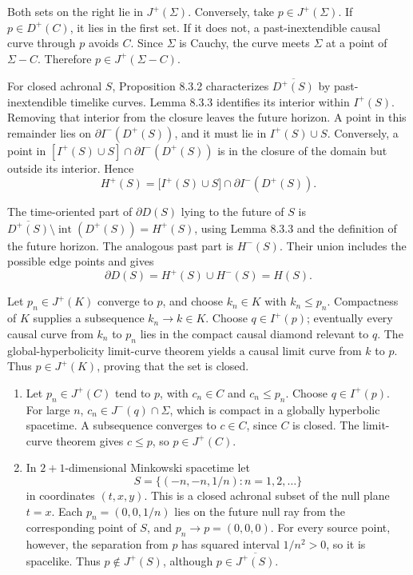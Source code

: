 \begin{enumerate}[leftmargin=2.8em,itemsep=1.2em]
Both sets on the right lie in \(J^+(\Sigma)\).  Conversely, take
\(p\in J^+(\Sigma)\).  If \(p\in D^+(C)\), it lies in the first set.  If it
does not, a past-inextendible causal curve through \(p\) avoids \(C\).  Since
\(\Sigma\) is Cauchy, the curve meets \(\Sigma\) at a point of
\(\Sigma-C\).  Therefore \(p\in J^+(\Sigma-C)\).

For closed achronal \(S\), Proposition 8.3.2 characterizes
\(\overline{D^+(S)}\) by past-inextendible timelike curves.  Lemma 8.3.3
identifies its interior within \(I^+(S)\).  Removing that interior from the
closure leaves the future horizon.  A point in this remainder lies on
\(\partial I^-(D^+(S))\), and it must lie in \(I^+(S)\cup S\).  Conversely,
a point in
\([I^+(S)\cup S]\cap\partial I^-(D^+(S))\) is in the closure of the domain
but outside its interior.  Hence
\[
 H^+(S)=\bigl[I^+(S)\cup S\bigr]
 \cap\partial I^-(D^+(S)).
\]

The time-oriented part of \(\partial D(S)\) lying to the future of \(S\) is
\(\overline{D^+(S)}\setminus\operatorname{int}(D^+(S))=H^+(S)\), using
Lemma 8.3.3 and the definition of the future horizon.  The analogous past
part is \(H^-(S)\).  Their union includes the possible edge points and gives
\[
 \partial D(S)=H^+(S)\cup H^-(S)=H(S).
\]

Let \(p_n\in J^+(K)\) converge to \(p\), and choose
\(k_n\in K\) with \(k_n\le p_n\).  Compactness of \(K\) supplies a
subsequence \(k_n\to k\in K\).  Choose \(q\in I^+(p)\); eventually every
causal curve from \(k_n\) to \(p_n\) lies in the compact causal diamond
relevant to \(q\).  The global-hyperbolicity limit-curve theorem yields a
causal limit curve from \(k\) to \(p\).  Thus \(p\in J^+(K)\), proving that
the set is closed.

\begin{enumerate}[label=\alph*),leftmargin=2em]
\item Let \(p_n\in J^+(C)\) tend to \(p\), with \(c_n\in C\) and
\(c_n\le p_n\).  Choose \(q\in I^+(p)\).  For large \(n\),
\(c_n\in J^-(q)\cap\Sigma\), which is compact in a globally hyperbolic
spacetime.  A subsequence converges to \(c\in C\), since \(C\) is closed.
The limit-curve theorem gives \(c\le p\), so \(p\in J^+(C)\).

\item In \(2+1\)-dimensional Minkowski spacetime let
\[
 S=\{(-n,-n,1/n):n=1,2,\ldots\}
\]
in coordinates \((t,x,y)\).  This is a closed achronal subset of the null
plane \(t=x\).  Each
\(p_n=(0,0,1/n)\) lies on the future null ray from the corresponding point
of \(S\), and \(p_n\to p=(0,0,0)\).  For every source point, however, the
separation from \(p\) has squared interval \(1/n^2>0\), so it is spacelike.
Thus \(p\notin J^+(S)\), although \(p\in\overline{J^+(S)}\).
\end{enumerate}
\end{enumerate}
